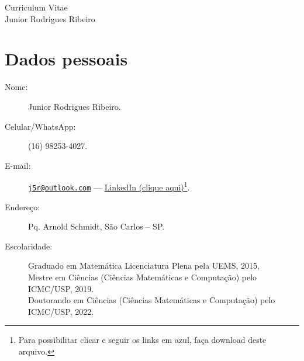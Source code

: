 \documentclass[11pt]{article}
\begin{document}
\begin{center}
\huge \sc Curriculum Vitae\\
\Large \sc Junior Rodrigues Ribeiro
\end{center}

\begin{flushright}
\end{flushright}
\vspace*{-4.4cm}

\section{Dados pessoais\dotfill  \hspace{3.4cm}\ }
\begin{description}
\item[Nome:] Junior Rodrigues Ribeiro.
\item[Celular/WhatsApp:] (16) 98253-4027.
\item[E-mail:] \href{mailto:j5r@outlook.com}{\nolinkurl{j5r@outlook.com}} --- \href{https://www.linkedin.com/in/j5r}{LinkedIn (clique aqui)}\footnote{Para possibilitar clicar e seguir os links em azul, faça download deste arquivo.}.
\item[Endereço:] Pq. Arnold Schmidt, São Carlos -- SP.
\item[Escolaridade:] Graduado em Matemática Licenciatura Plena pela UEMS, 2015,\\
\phantom{Escolarid} Mestre em Ciências (Ciências Matemáticas e Computação) pelo ICMC/USP, 2019.\\
\phantom{Escolarid} Doutorando em Ciências (Ciências Matemáticas e Computação) pelo ICMC/USP, 2022.
\end{description}
\end{document}
